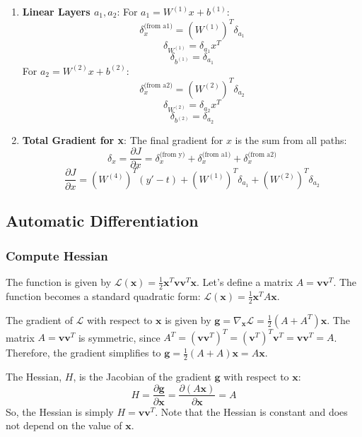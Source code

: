 \documentclass{article}
\begin{document}
\begin{enumerate}
    \item \textbf{Linear Layers $a_1, a_2$}:
    For $a_1 = W^{(1)}x + b^{(1)}$:
    \[ \delta_x^{\text{(from a1)}} = (W^{(1)})^T \delta_{a_1} \]
    \[ \delta_{W^{(1)}} = \delta_{a_1} x^T \]
    \[ \delta_{b^{(1)}} = \delta_{a_1} \]
    For $a_2 = W^{(2)}x + b^{(2)}$:
    \[ \delta_x^{\text{(from a2)}} = (W^{(2)})^T \delta_{a_2} \]
    \[ \delta_{W^{(2)}} = \delta_{a_2} x^T \]
    \[ \delta_{b^{(2)}} = \delta_{a_2} \]

    \item \textbf{Total Gradient for x}: The final gradient for $x$ is the sum from all paths:
    \[ \delta_x = \frac{\partial J}{\partial x} = \delta_x^{\text{(from y)}} + \delta_x^{\text{(from a1)}} + \delta_x^{\text{(from a2)}} \]
    \[ \frac{\partial J}{\partial x} = (W^{(4)})^T (y' - t) + (W^{(1)})^T \delta_{a_1} + (W^{(2)})^T \delta_{a_2} \]
\end{enumerate}

\subsection{Automatic Differentiation}

\subsubsection*{Compute Hessian}

The function is given by $\mathcal{L}(\mathbf{x}) = \frac{1}{2}\mathbf{x}^T\mathbf{v}\mathbf{v}^T\mathbf{x}$.
Let's define a matrix $A = \mathbf{v}\mathbf{v}^T$. The function becomes a standard quadratic form: $\mathcal{L}(\mathbf{x}) = \frac{1}{2}\mathbf{x}^T A \mathbf{x}$.

The gradient of $\mathcal{L}$ with respect to $\mathbf{x}$ is given by $\mathbf{g} = \nabla_{\mathbf{x}}\mathcal{L} = \frac{1}{2}(A + A^T)\mathbf{x}$.
The matrix $A = \mathbf{v}\mathbf{v}^T$ is symmetric, since $A^T = (\mathbf{v}\mathbf{v}^T)^T = (\mathbf{v}^T)^T\mathbf{v}^T = \mathbf{v}\mathbf{v}^T = A$.
Therefore, the gradient simplifies to $\mathbf{g} = \frac{1}{2}(A + A)\mathbf{x} = A\mathbf{x}$.

The Hessian, $H$, is the Jacobian of the gradient $\mathbf{g}$ with respect to $\mathbf{x}$:
\[ H = \frac{\partial \mathbf{g}}{\partial \mathbf{x}} = \frac{\partial (A\mathbf{x})}{\partial \mathbf{x}} = A \]
So, the Hessian is simply $H = \mathbf{v}\mathbf{v}^T$. Note that the Hessian is constant and does not depend on the value of $\mathbf{x}$.
\end{document}
